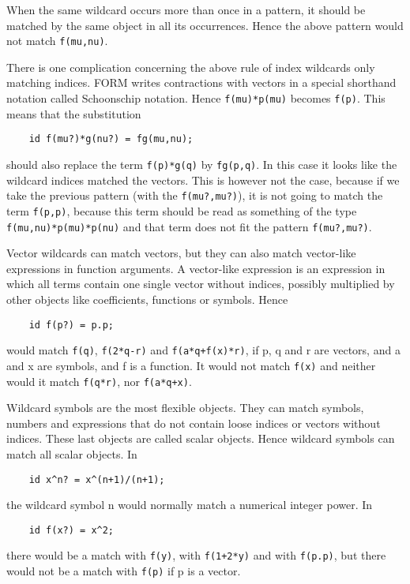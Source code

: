 When the same wildcard occurs more than once in a pattern, it should be 
matched by the same object in all its occurrences. Hence the above pattern 
would not match \verb:f(mu,nu):.

There is one complication concerning the above rule of index wildcards only 
matching indices. FORM writes contractions with vectors in a special 
shorthand notation called Schoonschip notation. Hence 
\verb:f(mu)*p(mu): becomes \verb:f(p):. This means that the substitution
\begin{verbatim}
    id f(mu?)*g(nu?) = fg(mu,nu);
\end{verbatim}
should also replace the term \verb:f(p)*g(q): by \verb:fg(p,q):. In this 
case it looks like the wildcard indices matched the vectors. This is 
however not the case, because if we take the previous pattern (with the 
\verb:f(mu?,mu?):), it is not going to match the term \verb:f(p,p):, 
because this term should be read as something of the type
\verb:f(mu,nu)*p(mu)*p(nu):
and that term does not fit the pattern \verb:f(mu?,mu?):.

Vector wildcards can match vectors, but they can 
also match vector-like expressions in function arguments. A vector-like 
expression is an expression in which all terms contain one single vector 
without indices, possibly multiplied by other objects like coefficients, 
functions or symbols. Hence
\begin{verbatim}
    id f(p?) = p.p;
\end{verbatim}
would match \verb:f(q):, \verb:f(2*q-r): and \verb:f(a*q+f(x)*r):, if p, q 
and r are vectors, and a and x are symbols, and f is a function. It would 
not match \verb:f(x): and neither would it match \verb:f(q*r):, nor 
\verb:f(a*q+x):.

Wildcard symbols are the most flexible objects. They 
can match symbols, numbers and expressions that do not contain loose 
indices or vectors without indices. These last objects are called 
scalar objects. Hence wildcard symbols can match all 
scalar objects. In
\begin{verbatim}
    id x^n? = x^(n+1)/(n+1);
\end{verbatim}
the wildcard symbol n would normally match a numerical integer power. In
\begin{verbatim}
    id f(x?) = x^2;
\end{verbatim}
there would be a match with \verb:f(y):, with \verb:f(1+2*y): and with 
\verb:f(p.p):, but there would not be a match with \verb:f(p): if p is a 
vector.

